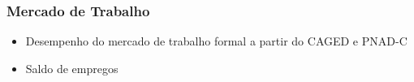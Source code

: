 \documentclass[12pt,aspectratio=169]{beamer}
\begin{document}
\begin{frame}
	\frametitle{Mercado de Trabalho}
	
	\begin{itemize}
		\item Desempenho do mercado de trabalho formal a partir do CAGED e PNAD-C
		\item Saldo de empregos
	\end{itemize}

\begin{figure}%
	\centering
	\qquad
	
\end{figure}
\end{frame}
\end{document}
